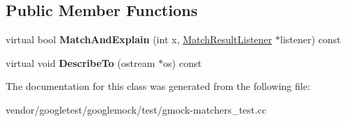 \subsection*{Public Member Functions}
\begin{DoxyCompactItemize}
\item 
\mbox{\label{classtesting_1_1gmock__matchers__test_1_1_new_even_matcher_impl_a56819af55d88569fdfaa51b937f76337}} 
virtual bool {\bfseries Match\+And\+Explain} (int x, \mbox{\hyperlink{classtesting_1_1_match_result_listener}{Match\+Result\+Listener}} $\ast$listener) const
\item 
\mbox{\label{classtesting_1_1gmock__matchers__test_1_1_new_even_matcher_impl_aece368c865501da4b30620d06a2690cd}} 
virtual void {\bfseries Describe\+To} (ostream $\ast$os) const
\end{DoxyCompactItemize}


The documentation for this class was generated from the following file\+:\begin{DoxyCompactItemize}
\item 
vendor/googletest/googlemock/test/gmock-\/matchers\+\_\+test.\+cc\end{DoxyCompactItemize}
